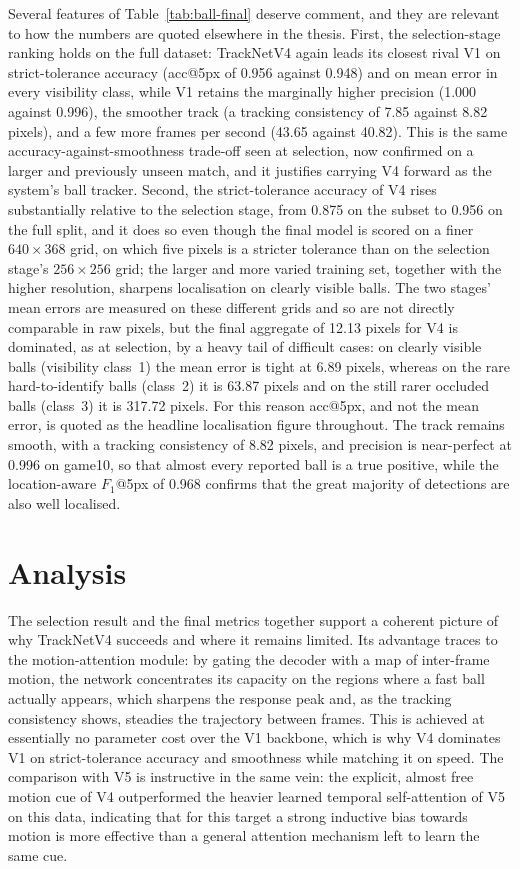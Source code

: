 Several features of Table~\ref{tab:ball-final} deserve comment, and they are
relevant to how the numbers are quoted elsewhere in the thesis. First, the
selection-stage ranking holds on the full dataset: TrackNetV4 again leads its
closest rival V1 on strict-tolerance accuracy (acc@5px of 0.956 against 0.948)
and on mean error in every visibility class, while V1 retains the marginally
higher precision (1.000 against 0.996), the smoother track (a tracking
consistency of 7.85 against 8.82 pixels), and a few more frames per second
(43.65 against 40.82). This is the same accuracy-against-smoothness trade-off
seen at selection, now confirmed on a larger and previously unseen match, and it
justifies carrying V4 forward as the system's ball tracker. Second, the
strict-tolerance accuracy of V4 rises substantially relative to the selection
stage, from 0.875 on the subset to 0.956 on the full split, and it does so even
though the final model is scored on a finer $640 \times 368$ grid, on which five
pixels is a stricter tolerance than on the selection stage's $256 \times 256$
grid; the larger and more varied training set, together with the higher
resolution, sharpens localisation on clearly visible balls. The two stages' mean
errors are measured on these different grids and so are not directly comparable
in raw pixels, but the final aggregate of 12.13 pixels for V4 is dominated, as at
selection, by a heavy tail of difficult cases: on clearly visible balls
(visibility class~1) the mean error is tight at 6.89 pixels, whereas on the rare
hard-to-identify balls (class~2) it is 63.87 pixels and on the still rarer
occluded balls (class~3) it is 317.72 pixels. For this reason acc@5px, and not
the mean error, is quoted as the headline localisation figure throughout. The
track remains smooth, with a tracking consistency of 8.82 pixels, and precision
is near-perfect at 0.996 on game10, so that almost every reported ball is a true
positive, while the location-aware $F_1$@5px of 0.968 confirms that the great
majority of detections are also well localised.


\section{Analysis}
\label{sec:ball-analysis}

The selection result and the final metrics together support a coherent picture
of why TrackNetV4 succeeds and where it remains limited. Its advantage traces to
the motion-attention module: by gating the decoder with a map of inter-frame
motion, the network concentrates its capacity on the regions where a fast ball
actually appears, which sharpens the response peak and, as the tracking
consistency shows, steadies the trajectory between frames. This is achieved at
essentially no parameter cost over the V1 backbone, which is why V4 dominates V1
on strict-tolerance accuracy and smoothness while matching it on speed. The
comparison with V5 is instructive in the same vein: the explicit, almost
free motion cue of V4 outperformed the heavier learned temporal self-attention
of V5 on this data, indicating that for this target a strong inductive bias
towards motion is more effective than a general attention mechanism left to
learn the same cue.


